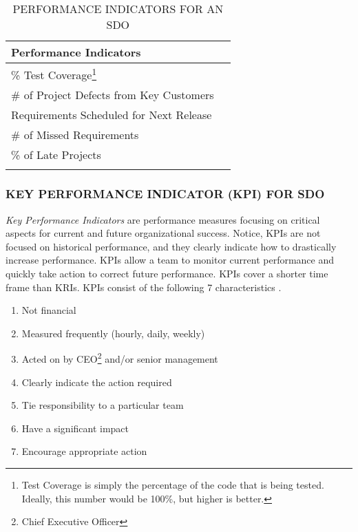 \documentclass[SDSUThesis.tex]{subfiles}
\begin{document}
            \begin{longtable}{@{}l l}
                \toprule%
                 \centering%
                 {\bfseries Performance Indicators} &
                 \\
                
                \cmidrule[0.4pt](r{0.125em}){1-1}%
                \endhead
                
                \% Test Coverage\footnote{Test Coverage is simply the percentage 
                    of the code that is being tested. Ideally, this 
                    number would be 100\%, but higher is better.}   \\
                \myrowcolour%
                \# of Project Defects from Key Customers  \\
                Requirements Scheduled for Next Release  \\
                \myrowcolour%
                \# of Missed Requirements \\
                \% of Late Projects \\
                
                \bottomrule
                
                \caption{PERFORMANCE INDICATORS FOR AN SDO}
                \label{tab:PI}
            \end{longtable}
            
        \subsubsection{KEY PERFORMANCE INDICATOR (KPI) FOR SDO}
            \textit{Key Performance Indicators} are performance measures
            focusing on critical aspects for current and future organizational
            success.  Notice, KPIs are not focused on historical performance,
            and they clearly indicate how to drastically increase performance.
            KPIs allow a team to monitor current performance and 
            quickly take action to correct future performance.
            KPIs cover a shorter time frame than KRIs.
            KPIs consist of the following 7 characteristics \cite{parmenter2010}.
            \begin{enumerate}
                \item Not financial
                \item Measured frequently (hourly, daily, weekly)
                \item Acted on by CEO\footnote{Chief Executive Officer} 
                    and/or senior management
                \item Clearly indicate the action required
                \item Tie responsibility to a particular team
                \item Have a significant impact
                \item Encourage appropriate action
            \end{enumerate}
            
\end{document}
